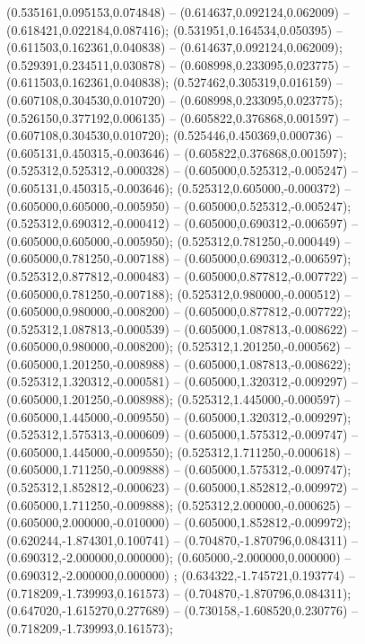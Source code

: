  (0.535161,0.095153,0.074848) -- (0.614637,0.092124,0.062009) -- (0.618421,0.022184,0.087416);
 (0.531951,0.164534,0.050395) -- (0.611503,0.162361,0.040838) -- (0.614637,0.092124,0.062009);
 (0.529391,0.234511,0.030878) -- (0.608998,0.233095,0.023775) -- (0.611503,0.162361,0.040838);
 (0.527462,0.305319,0.016159) -- (0.607108,0.304530,0.010720) -- (0.608998,0.233095,0.023775);
 (0.526150,0.377192,0.006135) -- (0.605822,0.376868,0.001597) -- (0.607108,0.304530,0.010720);
 (0.525446,0.450369,0.000736) -- (0.605131,0.450315,-0.003646) -- (0.605822,0.376868,0.001597);
 (0.525312,0.525312,-0.000328) -- (0.605000,0.525312,-0.005247) -- (0.605131,0.450315,-0.003646);
 (0.525312,0.605000,-0.000372) -- (0.605000,0.605000,-0.005950) -- (0.605000,0.525312,-0.005247);
 (0.525312,0.690312,-0.000412) -- (0.605000,0.690312,-0.006597) -- (0.605000,0.605000,-0.005950);
 (0.525312,0.781250,-0.000449) -- (0.605000,0.781250,-0.007188) -- (0.605000,0.690312,-0.006597);
 (0.525312,0.877812,-0.000483) -- (0.605000,0.877812,-0.007722) -- (0.605000,0.781250,-0.007188);
 (0.525312,0.980000,-0.000512) -- (0.605000,0.980000,-0.008200) -- (0.605000,0.877812,-0.007722);
 (0.525312,1.087813,-0.000539) -- (0.605000,1.087813,-0.008622) -- (0.605000,0.980000,-0.008200);
 (0.525312,1.201250,-0.000562) -- (0.605000,1.201250,-0.008988) -- (0.605000,1.087813,-0.008622);
 (0.525312,1.320312,-0.000581) -- (0.605000,1.320312,-0.009297) -- (0.605000,1.201250,-0.008988);
 (0.525312,1.445000,-0.000597) -- (0.605000,1.445000,-0.009550) -- (0.605000,1.320312,-0.009297);
 (0.525312,1.575313,-0.000609) -- (0.605000,1.575312,-0.009747) -- (0.605000,1.445000,-0.009550);
 (0.525312,1.711250,-0.000618) -- (0.605000,1.711250,-0.009888) -- (0.605000,1.575312,-0.009747);
 (0.525312,1.852812,-0.000623) -- (0.605000,1.852812,-0.009972) -- (0.605000,1.711250,-0.009888);
 (0.525312,2.000000,-0.000625) -- (0.605000,2.000000,-0.010000) -- (0.605000,1.852812,-0.009972);
 (0.620244,-1.874301,0.100741) -- (0.704870,-1.870796,0.084311) -- (0.690312,-2.000000,0.000000);
 (0.605000,-2.000000,0.000000) -- (0.690312,-2.000000,0.000000) ;
 (0.634322,-1.745721,0.193774) -- (0.718209,-1.739993,0.161573) -- (0.704870,-1.870796,0.084311);
 (0.647020,-1.615270,0.277689) -- (0.730158,-1.608520,0.230776) -- (0.718209,-1.739993,0.161573);
